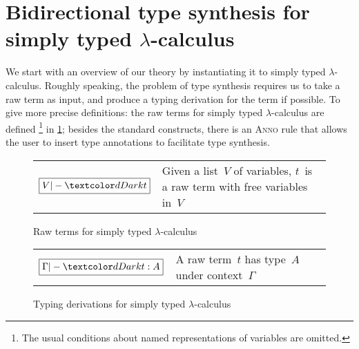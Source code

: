 
\section{Bidirectional type synthesis for simply typed \texorpdfstring{$\lambda$}{λ}-calculus} \label{sec:key-ideas}


We start with an overview of our theory by instantiating it to simply typed $\lambda$-calculus.
Roughly speaking, the problem of type synthesis requires us to take a raw term as input, and produce a typing derivation for the term if possible.
To give more precise definitions: the raw terms for simply typed $\lambda$-calculus are defined%
\footnote{The usual conditions about named representations of variables are omitted.}
in \cref{fig:STLC-raw-terms};
besides the standard constructs, there is an \textsc{Anno} rule that allows the user to insert type annotations to facilitate type synthesis.

\begin{figure}
  \small
  \bgroup
  \renewcommand{\arraystretch}{1.5}
  \begin{tabular}{ r l }
    $\boxed{V |- \isTerm{t}}$ & Given a list~$V$ of variables, $t$~is a raw term with free variables in~$V$
  \end{tabular}
  \egroup
  \centering
  \caption{Raw terms for simply typed $\lambda$-calculus}
  \label{fig:STLC-raw-terms}
\end{figure}

\begin{figure}
  \small
  \bgroup
  \renewcommand{\arraystretch}{1.5}
  \begin{tabular}{ r l }
    $\boxed{\Gamma |- \isTerm{t} : A}$ & A raw term~$t$ has type~$A$ under context~$\Gamma$
  \end{tabular}
  \egroup
  \centering
  \caption{Typing derivations for simply typed $\lambda$-calculus}
  \label{fig:STLC-typing-derivations}
\end{figure}

